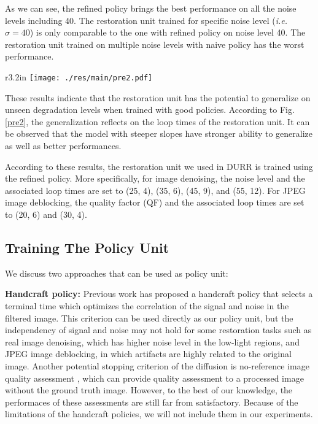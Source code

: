 \documentclass{article} %
\begin{document}
As we can see, the refined policy brings the best performance on all
the noise levels including 40. The restoration unit trained for specific
noise level (\textit{i.e.} $\sigma=40$) is only comparable to the one with
refined policy on noise level 40. The restoration unit trained on multiple noise levels
with naive policy has the worst performance.

\begin{wrapfigure}{r}{3.2in}
	\texttt{[image: ./res/main/pre2.pdf]}
	\caption{Average peak time on BSD68 with different training strategies.}
	\label{pre2}
\end{wrapfigure}

These results indicate that the restoration unit has the potential to
generalize on unseen degradation levels when trained with good policies.
According to Fig. \ref{pre2}, the generalization reflects
on the loop times of the restoration unit. It can be observed that the model
with steeper slopes have stronger ability to generalize as well as
better performances.

According to these results, the restoration unit we used in DURR is trained
using the refined policy. More specifically, for image denoising, the noise level
and the associated loop times are set to (25, 4), (35, 6), (45, 9), and (55, 12). For JPEG image deblocking, the quality factor (QF) and
the associated loop times are set to (20, 6) and (30, 4).

\subsection{Training The Policy Unit}

We discuss two approaches that can be used as policy unit:

\textbf{Handcraft policy:}  Previous work \citep{mrazek2003selection}
has proposed a handcraft policy that selects a terminal time
which optimizes the correlation of the signal and noise in
the filtered image. This criterion can be used directly as our
policy unit, but the independency of signal and noise may not hold
for some restoration tasks such as real image denoising, which has
higher noise level in the low-light regions, and JPEG image deblocking,
in which artifacts are highly related to the original image.
Another potential stopping criterion of the diffusion is
no-reference image quality assessment \citep{mittal2012no},
which can provide quality assessment to a processed image
without the ground truth image. However, to the best of our knowledge,
the performaces of these assessments are still far from satisfactory.
Because of the limitations of the handcraft policies,
we will not include them in our experiments.
\end{document}
